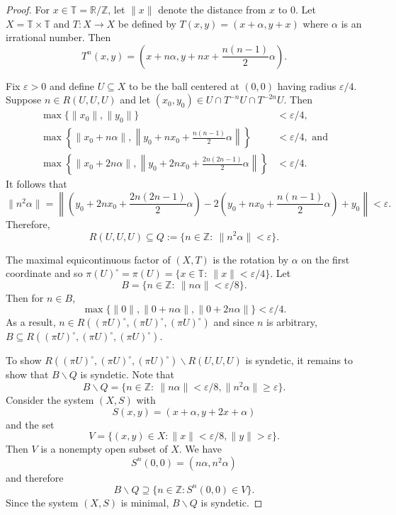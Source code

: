 \documentclass[10pt,a4paper]{amsart}
\newcommand{\R}{\mathbb{R}}
\newcommand{\T}{\mathbb{T}}
\newcommand{\Z}{\mathbb{Z}}
\renewcommand{\epsilon}{\varepsilon}
\renewcommand{\geq}{\geqslant}
\renewcommand{\setminus}{\backslash}
\begin{document}
\begin{proof}
For $x \in \T = \R/\Z$, let $\lVert x \rVert$ denote the distance from $x$ to $0$.
Let $X = \T \times \T$ and $T: X \to X$ be defined by $T(x, y) = (x + \alpha, y + x)$ where $\alpha$ is an irrational number. Then
\[
    T^n(x, y) = \left(x + n \alpha, y + n x + \frac{n(n-1)}{2} \alpha\right).
\]


Fix $\epsilon > 0$ and define $U \subseteq X$ to be the ball centered at $(0, 0)$ having radius $\epsilon/4$. 
Suppose $n \in R(U, U, U)$ and let $(x_0, y_0) \in U \cap T^{-n} U \cap T^{-2n} U$. Then
\begin{align*}
        \max\{\lVert x_0 \rVert, \lVert y_0 \rVert\} &< \epsilon/4, \\
    \max\left\{\lVert x_0 + n \alpha \rVert, \left\lVert y_0 + n x_0 + \frac{n(n-1)}{2} \alpha \right\rVert\right\} &< \epsilon/4, \text{ and} \\
    \max\left\{\lVert x_0 + 2n \alpha \rVert,
    \left\lVert y_0 + 2n x_0 + \frac{2n(2n-1)}{2} \alpha \right\rVert\right\} &< \epsilon/4.
\end{align*}
It follows that
\[
    \lVert n^2 \alpha \rVert = \left\lVert \left(y_0 + 2n x_0 + \frac{2n(2n-1)}{2} \alpha\right) - 2\left(y_0 + n x_0 + \frac{n(n-1)}{2} \alpha\right) + y_0\right\rVert < \epsilon.
\]
Therefore,
\[
    R(U, U, U) \subseteq Q := \{n \in \Z: \ \lVert n^2 \alpha \rVert < \epsilon\}.
\]


The maximal equicontinuous factor of $(X, T)$ is the rotation by $\alpha$ on the first coordinate and so $\pi(U)^\circ = \pi(U)= \{x \in \T: \ \lVert x \rVert < \epsilon/4\}$. Let 
\[
    B = \{n \in \Z: \ \lVert n \alpha \rVert < \epsilon /8\}.
\]
Then for $n \in B$,
\[
    \max\{\lVert 0 \rVert, \lVert 0 + n \alpha \rVert, \lVert 0 + 2 n \alpha \rVert\} < \epsilon/4.
\]
As a result, $n \in R((\pi U)^\circ, (\pi U)^\circ, (\pi U)^\circ)$ and since $n$ is arbitrary, $B \subseteq R((\pi U)^\circ, (\pi U)^\circ, (\pi U)^\circ)$.

To show $R((\pi U)^\circ, (\pi U)^\circ, (\pi U)^\circ) \setminus R(U, U, U)$ is syndetic, it remains to show that $B \setminus Q$ is syndetic. Note that 
\[
    B \setminus Q = \{n \in \Z: \ \lVert n \alpha \rVert < \epsilon/8, \lVert n^2 \alpha \rVert \geq \epsilon\}.
\]
Consider the system $(X, S)$ with 
\[
    S(x, y) = (x + \alpha, y + 2x + \alpha)
\]
and the set
\[
    V = \{(x, y) \in X: \lVert x \rVert < \epsilon/8, \lVert y \rVert > \epsilon\}.
\]
Then $V$ is a nonempty open subset of $X$. We have
\[
    S^n(0, 0) = (n \alpha, n^2 \alpha)
\]
and therefore
\[
    B \setminus Q \supseteq \{n \in \Z: S^n (0, 0) \in V\}.
\]
Since the system $(X, S)$ is minimal, $B \setminus Q$ is syndetic. 
\end{proof}
\end{document}
